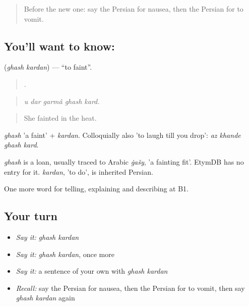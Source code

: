 \label{lesson:FA-C492-ghash-kardan}



\begin{quote}
Before the new one: say the Persian for nausea, then the Persian for to vomit.
\end{quote}

\subsection*{You'll want to know:  }
\textbf{ } (\emph{ghash kardan}) — \textquotedblleft{}to faint\textquotedblright{}.

\begin{quote}
    .
\end{quote}

\begin{quote}
\emph{u dar garmâ ghash kard.}
\end{quote}

\begin{quote}
She fainted in the heat.
\end{quote}

\emph{ghash} 'a faint' + \emph{kardan}. Colloquially also 'to laugh till you drop': \emph{az khande ghash kard}.

\begin{cousinweb}
\emph{ghash} is a loan, usually traced to Arabic \emph{ġašy}, 'a fainting fit'. EtymDB has no entry for it. \emph{kardan}, 'to do', is inherited Persian.
\end{cousinweb}

\begin{grammarlens}[title={What you've built}]
One more word for telling, explaining and describing at B1.
\end{grammarlens}

\subsection*{Your turn}
\begin{itemize}
\raggedright
  \item \emph{Say it:} \emph{ghash kardan}
  \item \emph{Say it:} \emph{ghash kardan}, once more
  \item \emph{Say it:} a sentence of your own with \emph{ghash kardan}
  \item \emph{Recall:} say the Persian for nausea, then the Persian for to vomit, then say \emph{ghash kardan} again
\end{itemize}


